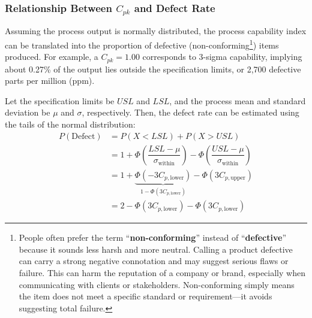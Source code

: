 \documentclass[twoside]{book}
\begin{document}
%

\subsubsection*{Relationship Between \(C_{pk}\) and Defect Rate}

Assuming the process output is normally distributed, the process capability index can be translated into the proportion of defective (non-conforming\footnote{People often prefer the term ``\textbf{non-conforming}'' instead of ``\textbf{defective}'' because it sounds less harsh and more neutral. Calling a product defective can carry a strong negative connotation and may suggest serious flaws or failure. This can harm the reputation of a company or brand, especially when communicating with clients or stakeholders. Non-conforming simply means the item does not meet a specific standard or requirement—it avoids suggesting total failure.}) items produced. For example, a \(C_{pk} = 1.00\) corresponds to 3-sigma capability, implying about 0.27\% of the output lies outside the specification limits, or 2,700 defective parts per million (ppm).

Let the specification limits be \(USL\) and \(LSL\), and the process mean and standard deviation be \(\mu\) and \(\sigma\), respectively. Then, the defect rate can be estimated using the tails of the normal distribution:
\begin{align*}
P(\text{Defect}) &= P(X < LSL) + P(X > USL)\\ &= 1+\Phi\left(\dfrac{LSL - \mu}{\sigma_{\text{within}}}\right) - \Phi\left(\dfrac{USL - \mu}{\sigma_{\text{within}}}\right)\\
&=1 + \underbrace{\Phi\left(-3C_{p,\text{lower}}\right)}_{1-\Phi\left(3C_{p,\text{lower}}\right)} - \Phi\left(3C_{p,\text{upper}}\right) \\
&=2 - \Phi\left(3C_{p,\text{lower}}\right) - \Phi\left(3C_{p,\text{lower}}\right)
\end{align*}
\end{document}
